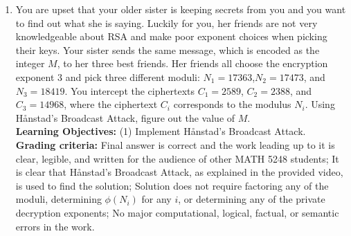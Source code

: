 \documentclass[12pt]{article}
\begin{document}
\begin{enumerate}
\item You are upset that your older sister is keeping secrets from you and you want to find out what she is saying. Luckily for you, her friends are not very knowledgeable about RSA and make poor exponent choices when picking their keys.  Your sister sends the same message, which is encoded as the integer $M$, to her three best friends.  Her friends all choose the encryption exponent $3$ and pick three different moduli: $N_1=17363$,$N_2=17473$, and $N_3=18419$.  You intercept the ciphertexts $C_1=2589$, $C_2=2388$, and $C_3=14968$, where the ciphertext $C_i$ corresponds to the modulus $N_i$.  Using H\r{a}nstad's Broadcast Attack, figure out the value of $M$. \\
{\bf Learning Objectives:} (1) Implement H\r{a}nstad's Broadcast Attack. \\
{\bf Grading criteria:} Final answer is correct and the work leading up to it is clear, legible, and written for the audience of other MATH 5248 students; It is clear that H\r{a}nstad's Broadcast Attack, as explained in the provided video, is used to find the solution; Solution does not require factoring any of the moduli, determining $\phi(N_i)$ for any $i$, or determining any of the private decryption exponents; No major computational, logical, factual, or semantic errors in the work.  
\end{enumerate}
\end{document}
